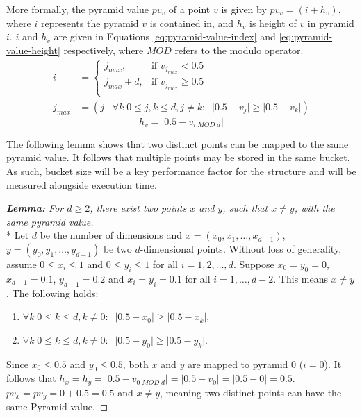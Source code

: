 More formally, the pyramid value $pv_v$ of a point $v$ is given by $pv_v = (i + h_v)$, where $i$ represents the pyramid $v$ is contained in, and $h_v$ is height of $v$ in pyramid $i$. $i$ and $h_v$ are given in Equations \ref{eq:pyramid-value-index} and \ref{eq:pyramid-value-height} respectively, where $MOD$ refers to the modulo operator.
\begin{align}
	i &= \begin{cases}
		j_{max},         & \text{if }v_{j_{max}} < 0.5\\
		j_{max} + d,   & \text{if }v_{j_{max}} \geq 0.5\\
	\end{cases}
	\label{eq:pyramid-value-index}
	\\
	j_{max} &= \left( j \;|\; \forall k \; 0 \leq j,k \leq d, j \neq k: \;\; \lvert 0.5 - v_j \rvert \geq \lvert 0.5 - v_k \rvert \right) \nonumber
\end{align}
\begin{equation}
	h_v = \lvert 0.5 - v_{i \; MOD \; d} \rvert
	\label{eq:pyramid-value-height}
\end{equation}

The following lemma shows that two distinct points can be mapped to the same pyramid value. It follows that multiple points may be stored in the same bucket. As such, bucket size will be a key performance factor for the structure and will be measured alongside execution time.

\vspace{22pt}

\begin{proof}[\textbf{Lemma: } For $d \geq 2$, there exist two points $x$ and $y$, such that $x \neq y$, with the same pyramid value]\mbox{}\\*
Let $d$ be the number of dimensions and $x = (x_0, x_1, \dots, x_{d -1})$, $y = (y_0, y_1, \dots, y_{d - 1})$ be two $d$-dimensional points. Without loss of generality, assume $0 \leq x_i \leq 1$ and $0 \leq y_i \leq 1$ for all $i = 1, 2, \dots, d$. Suppose $x_0 = y_0 = 0$, $x_{d - 1} = 0.1$, $y_{d - 1} = 0.2$ and $x_i = y_i = 0.1$ for all $i = 1, \dots, {d - 2}$. This means $x \neq y$. The following holds:
\begin{enumerate}
	\item $\forall k \; 0 \leq k \leq d, k \neq 0: \;\; \lvert 0.5 - x_0 \rvert \geq \lvert 0.5 - x_k \rvert$,
	\item $\forall k \; 0 \leq k \leq d, k \neq 0: \;\; \lvert 0.5 - y_0 \rvert \geq \lvert 0.5 - y_k \rvert$.
\end{enumerate}
Since $x_0 \leq 0.5$ and $y_0 \leq 0.5$, both $x$ and $y$ are mapped to pyramid 0 ($i = 0$). It follows that $h_x = h_y = \lvert 0.5 - v_{0 \; MOD \; d} \rvert = \lvert 0.5 - v_{0} \rvert = \lvert 0.5 - 0 \rvert = 0.5$. $pv_x = pv_y = 0 + 0.5 = 0.5$ and $x \neq y$, meaning two distinct points can have the same Pyramid value.

\end{proof}

